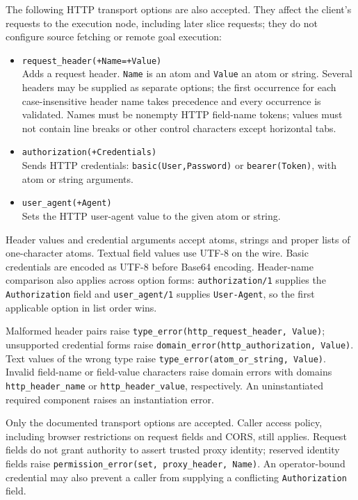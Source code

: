 The following HTTP transport options are also accepted. They affect the client's requests to the execution node, including
later slice requests; they do not configure source fetching or remote goal
execution:
\begin{itemize}
\item
  \texttt{request\_\allowbreak{}header(\allowbreak{}+Name=+Value)}\\
  Adds a request header. \texttt{Name} is an atom and \texttt{Value} an atom
  or string. Several headers may be supplied as separate options; the first
  occurrence for each case-insensitive header name takes precedence and every
  occurrence is validated. Names must be nonempty HTTP field-name tokens;
  values must not contain line breaks or other control characters except horizontal tabs.
\item
  \texttt{authorization(\allowbreak{}+Credentials)}\\
  Sends HTTP credentials: \texttt{basic(\allowbreak{}User,\allowbreak{}Password)} or
  \texttt{bearer(\allowbreak{}Token)}, with atom or string arguments.
\item
  \texttt{user\_\allowbreak{}agent(\allowbreak{}+Agent)}\\
  Sets the HTTP user-agent value to the given atom or string.
\end{itemize}
Header values and credential arguments accept atoms, strings and proper
lists of one-character atoms. Textual field values use UTF-8 on the wire.
Basic credentials are encoded as UTF-8 before
Base64 encoding. Header-name comparison also applies across option forms:
\texttt{authorization/1} supplies the \texttt{Authorization} field and
\texttt{user\_agent/1} supplies \texttt{User-Agent}, so the first applicable
option in list order wins.

Malformed header pairs raise \texttt{type\_error(http\_request\_header, Value)};
unsupported credential forms raise \texttt{domain\_error(http\_authorization, Value)}.
Text values of the wrong type raise \texttt{type\_error(atom\_or\_string, Value)}.
Invalid field-name or field-value characters raise domain errors with domains
\texttt{http\_header\_name} or \texttt{http\_header\_value}, respectively.
An uninstantiated required component raises an instantiation error.

Only the documented transport options are accepted. Caller access policy,
including browser restrictions on request fields and CORS, still applies.
Request fields do not grant authority to assert trusted proxy identity;
reserved identity fields raise
\texttt{permission\_error(set, proxy\_header, Name)}. An operator-bound
credential may also prevent a caller from supplying a conflicting
\texttt{Authorization} field.

